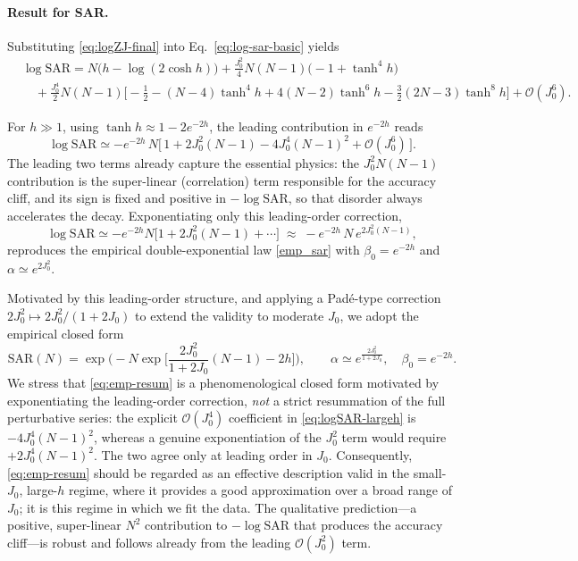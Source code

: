 \documentclass{article}
\theoremstyle{plain}
\begin{document}
\paragraph{Result for SAR.}
Substituting \eqref{eq:logZJ-final} into Eq.~\eqref{eq:log-sar-basic} yields
\begin{align}
&\log \mathrm{SAR}
= N\big(h - \log(2\cosh h)\big)
+ \frac{J_0^2}{4}N(N-1)\big(-1 + \tanh^4 h\big) \nonumber\\
&\quad
+ \frac{J_0^4}{2}N(N-1)
\Big[
-\tfrac{1}{2} - (N-4)\tanh^4 h
+ 4(N-2)\tanh^6 h
- \tfrac{3}{2}(2N-3)\tanh^8 h
\Big]+ \mathcal{O}(J_0^6).
\label{eq:logSAR-expand}
\end{align}

For \(h \gg 1\), using \(\tanh h \approx 1 - 2e^{-2h}\), the leading contribution in $e^{-2h}$ reads
\begin{equation}\label{eq:logSAR-largeh}
\log \mathrm{SAR}
\simeq
- e^{-2h}\, N
\Big[\,1 + 2J_0^2(N-1) - 4J_0^4(N-1)^2 + \mathcal{O}(J_0^6)\,\Big].
\end{equation}
The leading two terms already capture the essential physics: the $J_0^2 N(N-1)$ contribution is the super-linear (correlation) term responsible for the accuracy cliff, and its sign is fixed and positive in $-\log\mathrm{SAR}$, so that disorder always accelerates the decay. Exponentiating only this leading-order correction,
\begin{equation}
\log \mathrm{SAR} \simeq -e^{-2h} N\big[1 + 2J_0^2(N-1)+\cdots\big] \;\approx\; -e^{-2h}\,N\,e^{2J_0^2(N-1)},
\end{equation}
reproduces the empirical double-exponential law \cref{emp_sar} with $\beta_0 = e^{-2h}$ and $\alpha \simeq e^{2J_0^2}$.

Motivated by this leading-order structure, and applying a Pad\'e-type correction $2J_0^2 \mapsto 2J_0^2/(1+2J_0)$ to extend the validity to moderate $J_0$, we adopt the empirical closed form
\begin{equation}\label{eq:emp-resum}
\mathrm{SAR}(N)
= \exp\!\Big(
- N \exp\!\Big[\frac{2J_0^2}{1+2J_0}(N-1) - 2h\Big]
\Big),
\qquad
\alpha \simeq e^{\frac{2J_0^2}{1+2J_0}},\quad \beta_0 = e^{-2h}.
\end{equation}
We stress that \cref{eq:emp-resum} is a phenomenological closed form motivated by exponentiating the leading-order correction, \emph{not} a strict resummation of the full perturbative series: the explicit $\mathcal{O}(J_0^4)$ coefficient in \cref{eq:logSAR-largeh} is $-4J_0^4(N-1)^2$, whereas a genuine exponentiation of the $J_0^2$ term would require $+2J_0^4(N-1)^2$. The two agree only at leading order in $J_0$. Consequently, \cref{eq:emp-resum} should be regarded as an effective description valid in the small-$J_0$, large-$h$ regime, where it provides a good approximation over a broad range of $J_0$; it is this regime in which we fit the data. The qualitative prediction---a positive, super-linear $N^2$ contribution to $-\log\mathrm{SAR}$ that produces the accuracy cliff---is robust and follows already from the leading $\mathcal{O}(J_0^2)$ term.
\end{document}
